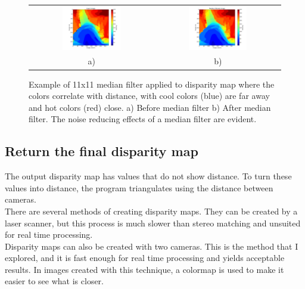 \documentclass[11pt,fleqn]{article}
\begin{document}
\begin{figure}[!h]
\begin{mdframed}
\centering
\begin{tabular}{cc}
\includegraphics[width=0.49\textwidth, trim=60 10 25 10, clip]{images/median1.png} &
\includegraphics[width=0.49\textwidth, trim=60 10 25 10, clip]{images/median2.png}\\[2pt]
a) & b) \\
\end{tabular}
\caption[Example of 11x11 median filter applied to disparity map]{Example of 11x11 median filter applied to disparity map where the colors correlate with distance, with cool colors (blue) are far away and hot colors (red) close. a) Before median filter b) After median filter. 
The noise reducing effects of a median filter are evident.}
\label{fig:medians}
\end{mdframed}
\end{figure}

\newpage
\subsection{Return the final disparity map}

The output disparity map has values that do not show distance. To turn these values into distance, the program triangulates using the distance between cameras.\\[5pt]
%
There are several methods of creating disparity maps. They can be created by a laser scanner, but this process is much slower than stereo matching and unsuited for real time processing. \\[5pt]
%
Disparity maps can also be created with two cameras. This is the method that I explored, and it is fast enough for real time processing and yields acceptable results. In images created with this technique, a colormap is used to make it easier to see what is closer. 
\end{document}
